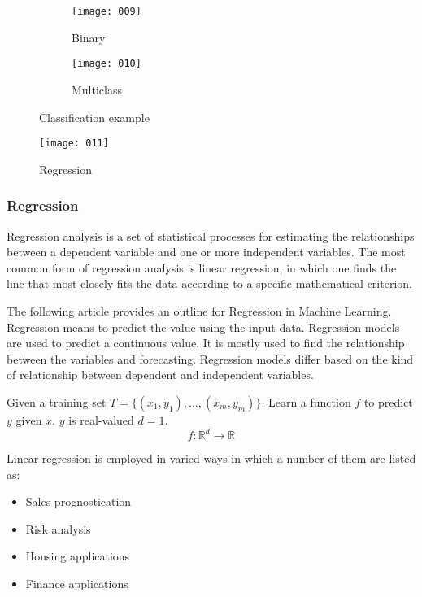 \begin{figure}[h!]
    \centering
    \begin{subfigure}{.4\textwidth}
        \texttt{[image: 009]}
        \caption{Binary}
    \end{subfigure}
    \begin{subfigure}{.4\textwidth}
        \texttt{[image: 010]}
        \caption{Multiclass}
    \end{subfigure}
    \caption{Classification example}
\end{figure}

\begin{figure}[b]
    \centering
    \texttt{[image: 011]}
    \caption{Regression}
\end{figure}

\subsubsection{Regression}
Regression analysis is a set of statistical processes for estimating the relationships between a dependent variable and one or more independent variables. The most common form of regression analysis is linear regression, in which one finds the line that most closely fits the data according to a specific mathematical criterion.

The following article provides an outline for Regression in Machine Learning. Regression means to predict the value using the input data. Regression models are used to predict a continuous value. It is mostly used to find the relationship between the variables and forecasting. Regression models differ based on the kind of relationship between dependent and independent variables.

Given a training set \(T = \{(x_1,y_1), ..., (x_m, y_m)\}\). Learn a function \(f\) to predict \(y\) given \(x\). \(y\) is real-valued \(d=1\).
\begin{equation}
    f: \mathbb{R}^d \to \mathbb{R}
\end{equation} 

Linear regression is employed in varied ways in which a number of them are listed as:
\begin{itemize}[topsep={0pt}, partopsep={0pt}]
\item Sales prognostication
\item Risk analysis
\item Housing applications
\item Finance applications
\end{itemize}

